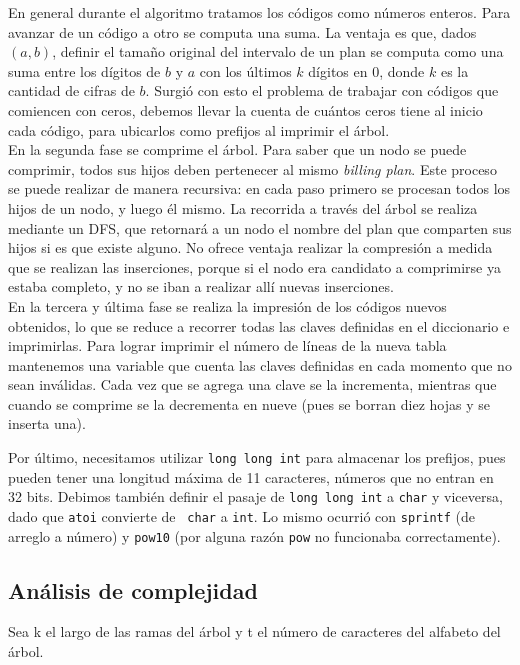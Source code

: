 En general durante el algoritmo tratamos los códigos como números
enteros. Para avanzar de un código a otro se computa una suma. La ventaja es
que, dados $(a,b)$, definir el tamaño original del intervalo de un plan se
computa como una suma entre los dígitos de $b$ y $a$ con los últimos $k$
dígitos en 0, donde $k$ es la cantidad de cifras de $b$. Surgió con esto
el problema de trabajar con códigos que comiencen con ceros, debemos llevar
la cuenta de cuántos ceros tiene al inicio cada código, para ubicarlos
como prefijos al imprimir el árbol.\\

En la segunda fase se comprime el árbol. Para saber que un nodo se puede
comprimir, todos sus hijos deben pertenecer al mismo {\sl billing plan}. Este
proceso se puede realizar de manera recursiva: en cada paso primero se
procesan todos los hijos de un nodo, y luego él mismo. La recorrida a
través del árbol se realiza mediante un DFS, que retornará a un nodo el
nombre del plan que comparten sus hijos si es que existe alguno. No ofrece
ventaja realizar la compresión a medida que se realizan las inserciones,
porque si el nodo era candidato a comprimirse ya estaba completo, y no se
iban a realizar allí nuevas inserciones.\\

En la tercera y última fase se realiza la impresión de los códigos nuevos
obtenidos, lo que se reduce a recorrer todas las claves definidas en el
diccionario e imprimirlas. Para lograr imprimir el número de líneas de
la nueva tabla mantenemos una variable que cuenta las claves definidas en
cada momento que no sean inválidas. Cada vez que se agrega una clave se
la incrementa, mientras que cuando se comprime se la decrementa en nueve
(pues se borran diez hojas y se inserta una).

Por último, necesitamos utilizar {\tt long long int} para almacenar los
prefijos, pues pueden tener una longitud máxima de 11 caracteres, números
que no entran en 32 bits. Debimos también definir el pasaje de {\tt long
long int} a {\tt char} y viceversa, dado que {\tt atoi} convierte de {\tt
char} a {\tt int}. Lo mismo ocurrió con {\tt sprintf} (de arreglo a número)
y {\tt pow10} (por alguna razón {\tt pow} no funcionaba correctamente).


\subsection*{Análisis de complejidad}

Sea k el largo de las ramas del árbol y t el número de caracteres del alfabeto del árbol.

